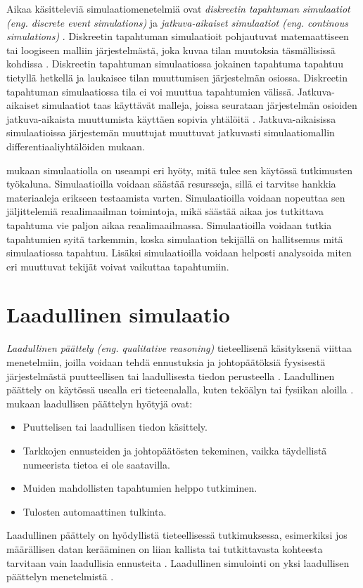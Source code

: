 \documentclass[utf8]{gradu3}
\begin{document}
Aikaa käsitteleviä simulaatiomenetelmiä ovat 
\textit{diskreetin tapahtuman simulaatiot (eng. discrete event simulations)}
ja \textit{jatkuva-aikaiset simulaatiot  (eng. continous simulations)}
\parencite{historyOfSimulation1996}.
Diskreetin tapahtuman simulaatioit pohjautuvat matemaattiseen tai loogiseen
malliin järjestelmästä, joka kuvaa tilan muutoksia täsmällisissä kohdissa
\parencite{historyOfSimulation1996}. 
Diskreetin tapahtuman simulaatiossa jokainen tapahtuma tapahtuu tietyllä 
hetkellä ja laukaisee tilan muuttumisen järjestelmän osiossa.
Diskreetin tapahtuman simulaatiossa  tila ei voi muuttua tapahtumien välissä.
Jatkuva-aikaiset simulaatiot taas käyttävät malleja, joissa seurataan 
järjestelmän osioiden jatkuva-aikaista muuttumista käyttäen sopivia 
yhtälöitä \parencite{historyOfSimulation1996}. 
Jatkuva-aikaisissa simulaatioissa järjestemän muuttujat muuttuvat 
jatkuvasti simulaatiomallin differentiaaliyhtälöiden mukaan.

\cite{banks1999introduction} mukaan simulaatiolla on useampi eri hyöty, 
mitä tulee sen käytössä tutkimusten työkaluna. 
Simulaatioilla voidaan säästää resursseja, sillä ei tarvitse hankkia materiaaleja erikseen testaamista varten. 
Simulaatioilla voidaan nopeuttaa sen jäljittelemiä reaalimaailman toimintoja,
mikä säästää aikaa jos tutkittava tapahtuma vie paljon aikaa reaalimaailmassa. Simulaatioilla voidaan tutkia tapahtumien syitä tarkemmin, koska simulaation tekijällä on hallitsemus mitä simulaatiossa tapahtuu.
Lisäksi simulaatioilla voidaan helposti analysoida miten eri muuttuvat tekijät voivat vaikuttaa tapahtumiin. 


\section{Laadullinen simulaatio} \label{laadullinen simulaatio}
\textit{Laadullinen päättely (eng. qualitative reasoning)} 
tieteellisenä käsityksenä viittaa menetelmiin, joilla
voidaan tehdä ennustuksia ja johtopäätöksiä fyysisestä järjestelmästä puutteellisen tai laadullisesta tiedon perusteella
\parencite{QualitativeReasoning1997}. 
Laadullinen päättely on käytössä usealla eri tieteenalalla, kuten teköälyn \parencite[luku~35]{qualitativeReasoning2014} tai fysiikan aloilla \parencite{QualitativePhysics1988}.
\textcite{QualitativeReasoning1997} mukaan laadullisen päättelyn hyötyjä ovat:
\begin{itemize}
    \item Puuttelisen tai laadullisen tiedon käsittely.
    \item Tarkkojen ennusteiden ja johtopäätösten tekeminen, 
    vaikka täydellistä numeerista tietoa ei ole saatavilla.
    \item Muiden mahdollisten tapahtumien helppo tutkiminen.
    \item Tulosten automaattinen tulkinta. 
\end{itemize}
Laadullinen päättely on hyödyllistä tieteellisessä tutkimuksessa, esimerkiksi jos 
määrällisen datan kerääminen on liian kallista tai 
tutkittavasta kohteesta tarvitaan vain laadullisia ennusteita
\parencite{QualitativeReasoning1997}.
Laadullinen simulointi on yksi laadullisen päättelyn menetelmistä \parencite{kuipers1986qualitative}. 
\end{document}
